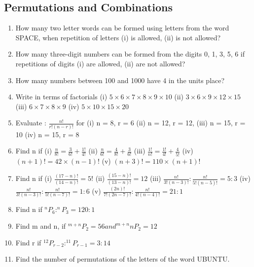 \documentclass[14pt]{article}
\begin{document}
\begin{multicols}{2}

\section{Permutations and Combinations}
\noindent
\begin{enumerate}
  
\item How many two letter words can be formed
using letters from the word SPACE, when
repetition of letters (i) is allowed, (ii) is not
allowed?
\item How many three-digit numbers can be
formed from the digits 0, 1, 3, 5, 6 if
repetitions of digits (i) are allowed, (ii) are
not allowed?
\item How many numbers between 100 and 1000
have 4 in the units place?
		 
\item Write in terms of factorials
(i)	$5 \times 6 \times 7 \times 8 \times 9 \times 10	$
(ii)	$3 \times 6 \times 9 \times 12 \times 15$
(iii)	$6 \times 7 \times 8 \times 9$
(iv)  $5 \times 10 \times 15 \times 20$

\item 
Evaluate : $\frac{n!}{r!(n-r)!}$ for  (i)	 n = 8, r = 6	 (ii)	 n = 12, r = 12,
	 (iii)	 n = 15, r = 10	 (iv)	 n = 15, r = 8
	 
\item Find n if
(i) $\frac{n}{8!}= \frac{3}{6!}+\frac{1!}{4!}$
(ii) $\frac{n}{6!}= \frac{4}{8!}+\frac{3}{6!}$
(iii) $\frac{1!}{n!}= \frac{1!}{4!}+\frac{4}{5!}$
(iv) $(n+1)!=42 \times (n-1)!$
(v) $(n+3)!=110 \times (n+1)!$

\item Find n if
(i) $\frac{(17-n)!}{(14-n)!}= 5!$
(ii) $\frac{(15-n)!}{(13-n)!}= 12$
(iii) $\frac{n!}{3!(n-3)!}:\frac{n!}{5!(n-5)!}=5:3$
(iv) $\frac{n!}{3!(n-3)!}:\frac{n!}{5!(n-7)!}=1:6$
(v) $\frac{(2n)!}{7!(2n-7)!}:\frac{n!}{4!(n-4)!}=21:1$ 

\item Find n if $^nP_6 : ^nP_3=120:1$

\item Find m and n, if $^{m+n}P_2 = 56 and ^{m+n}nP_2=12$

\item Find r if $^12P_{r-2} : ^11P_{r-1}=3:14$

\item Find the number of permutations of the
letters of the word UBUNTU.


\end{enumerate}
\end{multicols}
\end{document}
